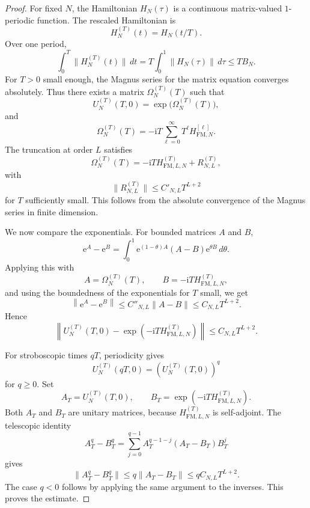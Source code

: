 \documentclass[11pt]{amsart}
\theoremstyle{plain}
\theoremstyle{definition}
\theoremstyle{remark}
\newcommand{\ii}{\mathrm i}
\newcommand{\ee}{\mathrm e}
\begin{document}
\begin{proof}
For fixed \(N\), the Hamiltonian \(H_N(\tau)\) is a continuous
matrix-valued \(1\)-periodic function.  The rescaled Hamiltonian is
\[
        H_N^{(T)}(t)=H_N(t/T).
\]
Over one period,
\[
        \int_0^T \|H_N^{(T)}(t)\|\,dt
        =
        T\int_0^1 \|H_N(\tau)\|\,d\tau
        \leq
        TB_N.
\]
For \(T>0\) small enough, the Magnus series for the matrix equation
converges absolutely.  Thus there exists a matrix
\(\Omega_N^{(T)}(T)\) such that
\[
        U_N^{(T)}(T,0)
        =
        \exp\bigl(\Omega_N^{(T)}(T)\bigr),
\]
and
\[
        \Omega_N^{(T)}(T)
        =
        -\ii T
        \sum_{\ell=0}^{\infty}
        T^\ell H_{\mathrm{FM},N}^{[\ell]}.
\]
The truncation at order \(L\) satisfies
\[
        \Omega_N^{(T)}(T)
        =
        -\ii T H_{\mathrm{FM},L,N}^{(T)}
        +
        R_{N,L}^{(T)},
\]
with
\[
        \|R_{N,L}^{(T)}\|
        \leq
        C'_{N,L}T^{L+2}
\]
for \(T\) sufficiently small.  This follows from the absolute
convergence of the Magnus series in finite dimension.

We now compare the exponentials.  For bounded matrices \(A\) and \(B\),
\[
        \ee^A-\ee^B
        =
        \int_0^1
        \ee^{(1-\theta)A}(A-B)\ee^{\theta B}
        \,d\theta.
\]
Applying this with
\[
        A=\Omega_N^{(T)}(T),
        \qquad
        B=-\ii T H_{\mathrm{FM},L,N}^{(T)},
\]
and using the boundedness of the exponentials for \(T\) small, we get
\[
        \left\|
        \ee^A-\ee^B
        \right\|
        \leq
        C''_{N,L}\|A-B\|
        \leq
        C_{N,L}T^{L+2}.
\]
Hence
\[
        \left\|
        U_N^{(T)}(T,0)
        -
        \exp\left(-\ii T H_{\mathrm{FM},L,N}^{(T)}\right)
        \right\|
        \leq
        C_{N,L}T^{L+2}.
\]

For stroboscopic times \(qT\), periodicity gives
\[
        U_N^{(T)}(qT,0)
        =
        \left(U_N^{(T)}(T,0)\right)^q
\]
for \(q\geq0\).  Set
\[
        A_T=U_N^{(T)}(T,0),
        \qquad
        B_T=\exp\left(-\ii T H_{\mathrm{FM},L,N}^{(T)}\right).
\]
Both \(A_T\) and \(B_T\) are unitary matrices, because
\(H_{\mathrm{FM},L,N}^{(T)}\) is self-adjoint.  The telescopic identity
\[
        A_T^q-B_T^q
        =
        \sum_{j=0}^{q-1}
        A_T^{q-1-j}(A_T-B_T)B_T^j
\]
gives
\[
        \|A_T^q-B_T^q\|
        \leq
        q\|A_T-B_T\|
        \leq
        qC_{N,L}T^{L+2}.
\]
The case \(q<0\) follows by applying the same argument to the inverses.
This proves the estimate.
\end{proof}
\end{document}
